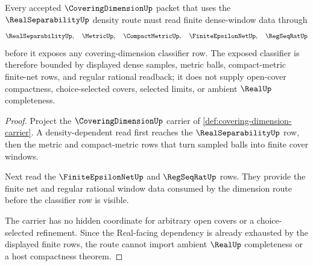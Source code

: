 \begin{theorem}
\label{thm:coveringdimension-real-separability-route-scope}
Every accepted $\CoveringDimensionUp$ packet that uses the $\RealSeparabilityUp$ density route must read finite dense-window data through
$$
\RealSeparabilityUp,\quad \MetricUp,\quad \CompactMetricUp,\quad \FiniteEpsilonNetUp,\quad \RegSeqRatUp
$$
before it exposes any covering-dimension classifier row. The exposed classifier is therefore bounded by displayed dense samples, metric balls, compact-metric finite-net rows, and regular rational readback; it does not supply open-cover compactness, choice-selected covers, selected limits, or ambient $\RealUp$ completeness.
\end{theorem}
\begin{proof}
Project the $\CoveringDimensionUp$ carrier of \autoref{def:covering-dimension-carrier}. A density-dependent read first reaches the $\RealSeparabilityUp$ row, then the metric and compact-metric rows that turn sampled balls into finite cover windows.

Next read the $\FiniteEpsilonNetUp$ and $\RegSeqRatUp$ rows. They provide the finite net and regular rational window data consumed by the dimension route before the classifier row is visible.

The carrier has no hidden coordinate for arbitrary open covers or a choice-selected refinement. Since the Real-facing dependency is already exhausted by the displayed finite rows, the route cannot import ambient $\RealUp$ completeness or a host compactness theorem.
\end{proof}
